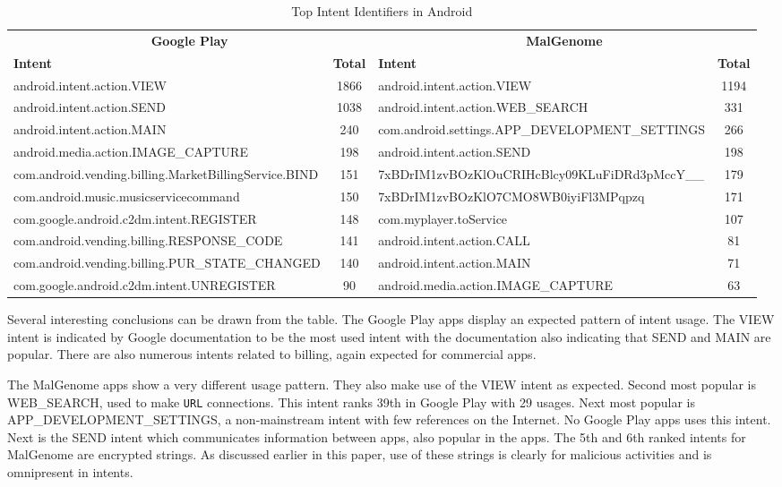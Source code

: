 \begin{table*}[t]
  \begin{center}
    {\small
\begin{tabular}{|l|c|l|c|}
\hline
\multicolumn{2}{|c|}{{\bf Google Play}} &    \multicolumn{2}{c|}{{\bf MalGenome}} \\

\bf{Intent} & \bf{Total} & \bf{Intent}    & \bf{Total}\\
\hline
  android.intent.action.VIEW &  1866 & android.intent.action.VIEW & 1194\\
  android.intent.action.SEND &  1038 & android.intent.action.WEB\_SEARCH & 331\\
  android.intent.action.MAIN &  240 & com.android.settings.APP\_DEVELOPMENT\_SETTINGS & 266\\ 
  android.media.action.IMAGE\_CAPTURE & 198 & android.intent.action.SEND & 198\\
  com.android.vending.billing.MarketBillingService.BIND & 151 & 7xBDrIM1zvBOzKlOuCRIHcBlcy09KLuFiDRd3pMccY\_\_ & 179\\
  com.android.music.musicservicecommand & 150 & 7xBDrIM1zvBOzKlO7CMO8WB0iyiFl3MPqpzq  &	171\\
  com.google.android.c2dm.intent.REGISTER & 148 & com.myplayer.toService & 107\\
  com.android.vending.billing.RESPONSE\_CODE & 141 & android.intent.action.CALL  & 81\\
  com.android.vending.billing.PUR\_STATE\_CHANGED & 140 & android.intent.action.MAIN & 71\\
  com.google.android.c2dm.intent.UNREGISTER & 90 & android.media.action.IMAGE\_CAPTURE & 63\\
\hline
\end{tabular}
}
\vspace{.1in}
    \caption{Top Intent Identifiers in Android}
    \label{table:intent}
  \end{center}
\end{table*}

Several interesting conclusions can be drawn from the table.  The Google Play apps display an expected pattern of intent usage.  The VIEW intent is indicated by Google documentation to be the most used intent with the documentation also indicating that SEND and MAIN are popular.  There are also numerous intents related to billing, again expected for commercial apps.

The MalGenome apps show a very different usage pattern.  They also make use of the VIEW intent as expected.  Second most popular is WEB\_SEARCH, used to make \texttt{URL} connections.  This intent ranks 39th in Google Play with 29 usages.  Next most popular is APP\_DEVELOPMENT\_SETTINGS, a non-mainstream intent with few references on the Internet.  No Google Play apps uses this intent. Next is the SEND intent which communicates information between apps, also popular in the 
 apps.  The 5th and 6th ranked intents for MalGenome are encrypted strings.  As
discussed earlier in this paper, use of these strings is clearly for malicious
activities and is omnipresent in intents.

